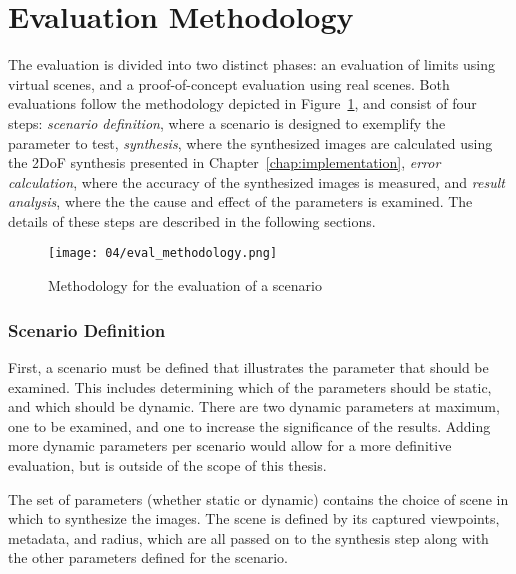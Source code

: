 
\section{Evaluation Methodology}
The evaluation is divided into two distinct phases: an evaluation of limits using virtual scenes, and a proof-of-concept evaluation using real scenes. Both evaluations follow the methodology depicted in Figure~\ref{fig:eval-methodology}, and consist of four steps: \emph{scenario definition}, where a scenario is designed to exemplify the parameter to test, \emph{synthesis}, where the synthesized images are calculated using the 2DoF synthesis presented in Chapter~\ref{chap:implementation}, \emph{error calculation}, where the accuracy of the synthesized images is measured, and \emph{result analysis}, where the the cause and effect of the parameters is examined. The details of these steps are described in the following sections.

\begin{figure}
		\centering
		\texttt{[image: 04/eval\_methodology.png]}
		\caption{Methodology for the evaluation of a scenario}
		\label{fig:eval-methodology}
\end{figure}

\subsubsection{Scenario Definition}
First, a scenario must be defined that illustrates the parameter that should be examined. This includes determining which of the parameters should be static, and which should be dynamic. There are two dynamic parameters at maximum, one to be examined, and one to increase the significance of the results. Adding more dynamic parameters per scenario would allow for a more definitive evaluation, but is outside of the scope of this thesis.

The set of parameters (whether static or dynamic) contains the choice of scene in which to synthesize the images. The scene is defined by its captured viewpoints, metadata, and radius, which are all passed on to the synthesis step along with the other parameters defined for the scenario.

